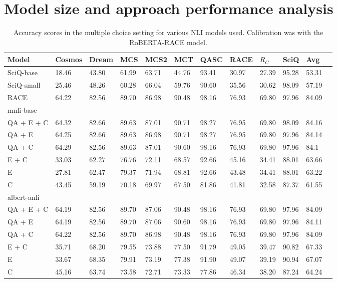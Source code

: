 \documentclass[11pt]{article}
\begin{document}
\section{Model size and approach performance analysis}
\label{sec:appendix}
\begin{table}[]
\centering
\begin{tabular}{llllllllllll}
\hline
Model & Cosmos & Dream & MCS & MCS2 & MCT & QASC & RACE & $R_C$ & SciQ & Avg \\ \hline
SciQ-base & 18.46 & 43.80 & 61.99 & 63.71 & 44.76 & 93.41 & 30.97 & 27.39 & 95.28 & 53.31 \\
SciQ-small &  25.46 & 48.26 & 60.28 & 66.04 & 59.76 & 90.60 & 35.56 & 30.62 & 98.09 & 57.19 \\
RACE & 64.22 & 82.56 & 89.70 & 86.98 & 90.48 & 98.16 & 76.93 & 69.80 & 97.96 & 84.09 \\ \hline
mnli-base \\ 
 QA + E + C & 64.32 & 82.66 & 89.63 & 87.01 & 90.71 & 98.27 & 76.95 & 69.80 & 98.09 & 84.16 \\
  QA + E & 64.25 & 82.66 & 89.63 & 86.98 & 90.71 & 98.27 & 76.95 & 69.80 & 97.96 & 84.14 \\
  QA + C & 64.29 & 82.56 & 89.63 & 87.01 & 90.60 & 98.16 & 76.93 & 69.80 & 97.96 & 84.1 \\
  E + C & 33.03 & 62.27 & 76.76 & 72.11 & 68.57 & 92.66 & 45.16 & 34.41 & 88.01 & 63.66 \\
  E & 27.81 & 62.47 & 79.37 & 71.94 & 68.81 & 92.66 & 43.48 & 34.41 & 88.01 & 63.22 \\
  C & 43.45 & 59.19 & 70.18 & 69.97 & 67.50 & 81.86 & 41.81 & 32.58 & 87.37 & 61.55 \\ \hline
 albert-anli \\ 
QA + E + C & 64.19 & 82.56 & 89.70 & 87.06 & 90.48 & 98.16 & 76.93 & 69.80 & 97.96 & 84.09 \\
  QA + E & 64.19 & 82.56 & 89.70 & 87.06 & 90.60 & 98.16 & 76.93 & 69.80 & 97.96 & 84.11 \\
  QA + C & 64.22 & 82.56 & 89.70 & 86.98 & 90.48 & 98.16 & 76.93 & 69.80 & 97.96 & 84.09 \\
  E + C & 35.71 & 68.20 & 79.55 & 73.88 & 77.50 & 91.79 & 49.05 & 39.47 & 90.82 & 67.33 \\
  E & 33.67 & 68.35 & 79.91 & 73.19 & 77.38 & 91.90 & 49.07 & 39.19 & 90.94 & 67.07 \\
  C & 45.16 & 63.74 & 73.58 & 72.71 & 73.33 & 77.86 & 46.34 & 38.20 & 87.24 & 64.24 \\ \hline
\end{tabular}
\caption{Accuracy scores in the multiple choice setting for various NLI models used. Calibration was with the RoBERTA-RACE model.}
\label{tab:cross_mc_performance}
\end{table}
\end{document}
